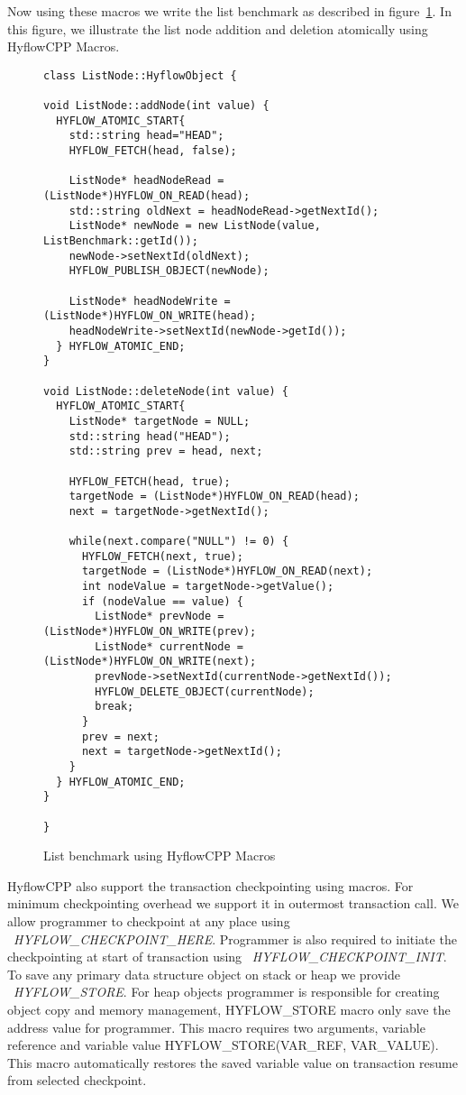 \documentclass[12pt,english]{report}
\begin{document}
Now using these macros we write the list benchmark as described in figure~\ref{Fig:listMacro}. In this figure, we illustrate the list node addition and deletion atomically using HyflowCPP Macros. 
\begin{figure}
\centering
\begin{lstlisting}
class ListNode::HyflowObject {

void ListNode::addNode(int value) {
  HYFLOW_ATOMIC_START{
	std::string head="HEAD";
	HYFLOW_FETCH(head, false);

	ListNode* headNodeRead =  (ListNode*)HYFLOW_ON_READ(head);
	std::string oldNext = headNodeRead->getNextId();
	ListNode* newNode = new ListNode(value, ListBenchmark::getId());
	newNode->setNextId(oldNext);
	HYFLOW_PUBLISH_OBJECT(newNode);

	ListNode* headNodeWrite = (ListNode*)HYFLOW_ON_WRITE(head);
	headNodeWrite->setNextId(newNode->getId());
  } HYFLOW_ATOMIC_END;
}

void ListNode::deleteNode(int value) {
  HYFLOW_ATOMIC_START{
	ListNode* targetNode = NULL;
	std::string head("HEAD");
	std::string prev = head, next;

	HYFLOW_FETCH(head, true);
	targetNode = (ListNode*)HYFLOW_ON_READ(head);
	next = targetNode->getNextId();

	while(next.compare("NULL") != 0) {
	  HYFLOW_FETCH(next, true);
	  targetNode = (ListNode*)HYFLOW_ON_READ(next);
	  int nodeValue = targetNode->getValue();
	  if (nodeValue == value) {
		ListNode* prevNode = (ListNode*)HYFLOW_ON_WRITE(prev);
		ListNode* currentNode = (ListNode*)HYFLOW_ON_WRITE(next);
		prevNode->setNextId(currentNode->getNextId());
		HYFLOW_DELETE_OBJECT(currentNode);
		break;
	  }
	  prev = next;
	  next = targetNode->getNextId();
	}
  } HYFLOW_ATOMIC_END;
}

}
\end{lstlisting}
\caption{List benchmark using HyflowCPP Macros}
\label{Fig:listMacro}
\end{figure}

HyflowCPP also support the transaction checkpointing using macros. For minimum checkpointing overhead we support it in outermost transaction call. We allow programmer to checkpoint at any place using ~\emph{HYFLOW{\_}CHECKPOINT{\_}HERE}. Programmer is also required to initiate the checkpointing at start of transaction using ~\emph{HYFLOW{\_}CHECKPOINT{\_}INIT}. To save any primary data structure object on stack or heap we provide ~\emph{HYFLOW{\_}STORE}. For heap objects programmer is responsible for creating object copy and memory management, HYFLOW{\_}STORE macro only save the address value for programmer. This macro requires two arguments, variable reference and variable value HYFLOW{\_}STORE(VAR{\_}REF, VAR{\_}VALUE). This macro automatically restores the saved variable value on transaction resume from selected checkpoint. 
\end{document}
